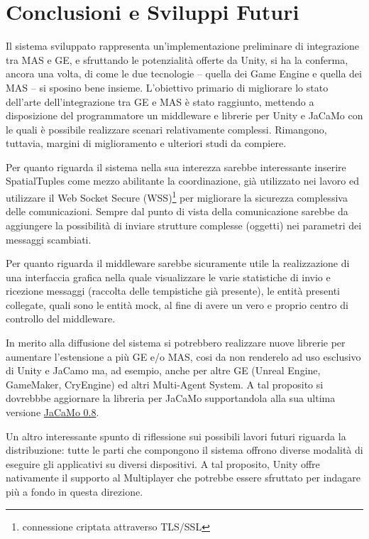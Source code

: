 \chapter{Conclusioni e Sviluppi Futuri}

Il sistema sviluppato rappresenta un'implementazione preliminare di integrazione tra MAS e GE, e sfruttando le potenzialità offerte da Unity, si ha la conferma, ancora una volta, di come le due tecnologie – quella dei Game Engine e quella dei MAS – si sposino bene insieme. L'obiettivo primario di migliorare lo stato dell'arte dell'integrazione tra GE e MAS è stato raggiunto, mettendo a disposizione del programmatore un middleware e librerie per Unity e JaCaMo con le quali è possibile realizzare scenari relativamente complessi. Rimangono, tuttavia, margini di miglioramento e ulteriori studi da compiere.

\medskip

Per quanto riguarda il sistema nella sua interezza sarebbe interessante inserire SpatialTuples come mezzo abilitante la coordinazione, già utilizzato nei lavoro \cite{amslaurea16100} ed utilizzare il Web Socket Secure (WSS)\footnote{connessione criptata attraverso TLS/SSL} per migliorare la sicurezza complessiva delle comunicazioni. Sempre dal punto di vista della comunicazione sarebbe da aggiungere la possibilità di inviare strutture complesse (oggetti) nei parametri dei messaggi scambiati.

\medskip

Per quanto riguarda il middleware sarebbe sicuramente utile la realizzazione di una interfaccia grafica nella quale visualizzare le varie statistiche di invio e ricezione messaggi (raccolta delle tempistiche già presente), le entità presenti collegate, quali sono le entità mock, al fine di avere un vero e proprio centro di controllo del middleware.

\medskip 

In merito alla diffusione del sistema si potrebbero realizzare nuove librerie per aumentare l'estensione a più GE e/o MAS, cosi da non renderelo ad uso esclusivo di Unity e JaCamo ma, ad esempio, anche per altre GE (Unreal Engine, GameMaker, CryEngine) ed altri Multi-Agent System. A tal proposito si dovrebbbe aggiornare la libreria per JaCaMo supportandola alla sua ultima versione \href{https://sourceforge.net/projects/jacamo/files/version-0/}{JaCaMo 0.8}. 

\medskip 

Un altro interessante spunto di riflessione sui possibili lavori futuri riguarda la distribuzione: tutte le parti che compongono il sistema offrono diverse modalità di eseguire gli applicativi su diversi dispositivi. A tal proposito, Unity offre nativamente il supporto al Multiplayer che potrebbe essere sfruttato per indagare più a fondo in questa direzione.